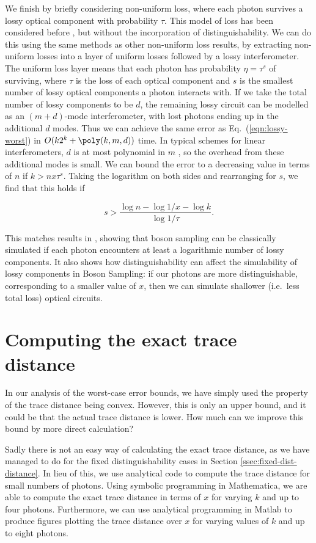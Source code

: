 We finish by briefly considering non-uniform loss, where each photon survives a lossy optical component with probability $\tau$. 
This model of loss has been considered before \cite{garciapatron2017,oszmaniec2018}, but without the incorporation of distinguishability. We can do this using the same methods as other non-uniform loss results, by extracting non-uniform losses into a layer of uniform losses followed by a lossy interferometer. 
The uniform loss layer means that each photon has probability $\eta=\tau^s$ of surviving, where $\tau$ is the loss of each optical component and $s$ is the smallest number of lossy optical components a photon interacts with. 
If we take the total number of lossy components to be $d$, the remaining lossy circuit can be modelled as an $(m+d)$-mode interferometer, with lost photons ending up in the additional $d$ modes. 
Thus we can achieve the same error as Eq.\ (\ref{eqn:lossy-worst}) in $O(k2^k+\poly(k,m,d))$ time. 
In typical schemes for linear interferometers, $d$ is at most polynomial in $m$ \cite{reck1994,clements2016}, so the overhead from these additional modes is small. 
We can bound the error to a decreasing value in terms of $n$ if $k>nx\tau^s$. Taking the logarithm on both sides and rearranging for $s$, we find that this holds if

\begin{equation}
s>\frac{\log n-\log 1/x-\log k}{\log1/\tau}.
\end{equation}

This matches results in \cite{garciapatron2017,oszmaniec2018}, showing that boson sampling can be classically simulated if each photon encounters at least a logarithmic number of lossy components. 
It also shows how distinguishability can affect the simulability of lossy components in Boson Sampling: if our photons are more distinguishable, corresponding to a smaller value of $x$, then we can simulate shallower (i.e.\ less total loss) optical circuits.

\section{Computing the exact trace distance}

In our analysis of the worst-case error bounds, we have simply used the property of the trace distance being convex. However, this is only an upper bound, and it could be that the actual trace distance is lower. How much can we improve this bound by more direct calculation?

Sadly there is not an easy way of calculating the exact trace distance, as we have managed to do for the fixed distinguishability cases in Section \ref{ssec:fixed-dist-distance}. In lieu of this, we use analytical code to compute the trace distance for small numbers of photons. Using symbolic programming in Mathematica, we are able to compute the exact trace distance in terms of $x$ for varying $k$ and up to four photons. Furthermore, we can use analytical programming in Matlab to produce figures plotting the trace distance over $x$ for varying values of $k$ and up to eight photons.

